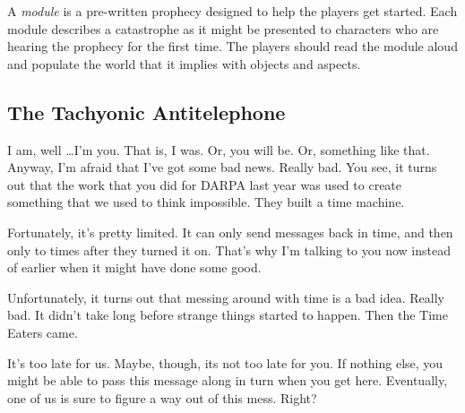 \documentclass[12pt, a5paper, parskip=half-, footheight=1.4cm]{scrartcl}
\begin{document}
A \emph{module} is a pre-written prophecy designed to help the players get started.
Each module describes a catastrophe as it might be presented to characters who are hearing the prophecy for the first time.  The players should read the module aloud and populate the world that it implies with objects and aspects.

\subsection*{The Tachyonic Antitelephone} \label{subsection:the-tachyonic-antitelephone}
I am, well \ldots I'm you.  That is, I was. Or, you will be.  Or, something like that. Anyway, I'm afraid that I've got some bad news. Really bad. You see, it turns out that the work that you did for DARPA last year was used to create something that we used to think impossible.
They built a time machine. 

Fortunately, it's pretty limited.  It can only send messages back in time, and then only to times after they turned it on.  That's why I'm talking to you now instead of earlier when it might have done some good.

Unfortunately, it turns out that messing around with time is a bad idea.
Really bad. It didn't take long before strange things started to happen.
Then the Time Eaters came.

It's too late for us. 
Maybe, though, its not too late for you.
If nothing else, you might be able to pass this message along in turn when you get here. 
Eventually, one of us is sure to figure a way out of this mess.
Right?

%
%
\end{document}
